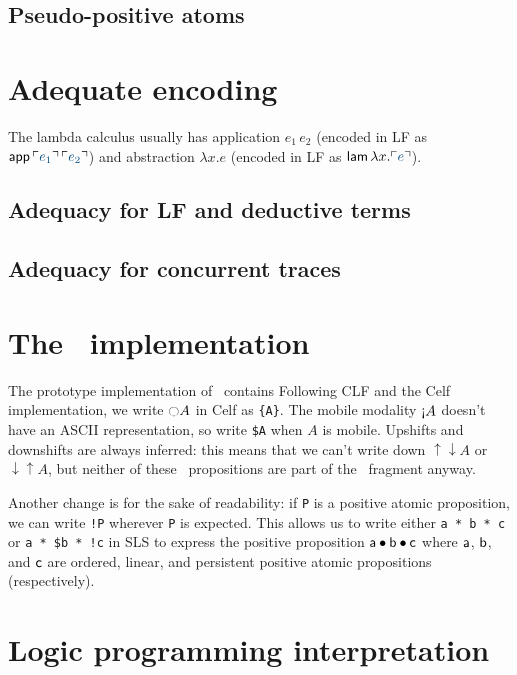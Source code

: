 \subsection{Pseudo-positive atoms}
\label{sec:pseudopositive}

\section{Adequate encoding}

The lambda
calculus usually has application $e_1\,e_2$ (encoded in LF as ${\sf
  app}\,\interp{e_1}\,\interp{e_2}$) and abstraction $\lambda x.e$
(encoded in LF as ${\sf lam}\,\lambda x. \interp{e}$). 

\subsection{Adequacy for LF and deductive terms}

\subsection{Adequacy for concurrent traces}


\section{The \sls~implementation}
\label{sec:prototype}

The prototype implementation of \sls~contains 
Following CLF and the Celf implementation, we write ${\ocircle}A$ in
Celf as \verb|{A}|. The mobile modality ${\gnab}A$ doesn't have an
ASCII representation, so write \verb|$A| when $A$ is
mobile. Upshifts and downshifts are always inferred: this means that
we can't write down ${\uparrow}{\downarrow}A$ or
${\downarrow}{\uparrow}A$, but neither of these \ollll~propositions
are part of the \sls~fragment anyway.

Another change is for the sake of readability: if \verb|P| is a
positive atomic proposition, we can write \verb|!P| wherever \verb|P|
is expected. This allows us to write either \verb|a * b * c| or
\verb|a * $b * !c| in SLS to express the positive proposition ${\sf a}
\mathbin{\bullet} {\sf b} \mathbin{\bullet} {\sf c}$ where ${\sf a}$, ${\sf b}$, and ${\sf c}$
are ordered, linear, and persistent positive atomic propositions
(respectively).

\section{Logic programming interpretation}
\label{sec:framework-logicprog}


